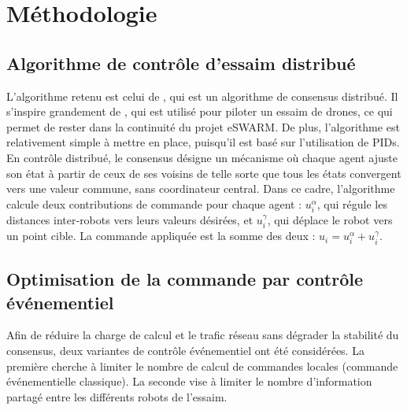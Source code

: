 \section{Méthodologie}

\subsection{Algorithme de contrôle d'essaim distribué}

L'algorithme retenu est celui de \cite{koung_consensus-based_2020}, qui est un algorithme de consensus distribué. Il s'inspire grandement de \cite{saif_distributed_2019}, qui est utilisé pour piloter un essaim de drones, ce qui permet de rester dans la continuité du projet eSWARM. De plus, l'algorithme est relativement simple à mettre en place, puisqu'il est basé sur l'utilisation de PIDs. 
En contrôle distribué, le consensus désigne un mécanisme où chaque agent ajuste son état à partir de ceux de ses voisins de telle sorte que tous les états convergent vers une valeur commune, sans coordinateur central.
Dans ce cadre, l’algorithme calcule deux contributions de commande pour chaque agent : $u_i^\alpha$, qui régule les distances inter‑robots vers leurs valeurs désirées, et $u_i^\gamma$, qui déplace le robot vers un point cible. La commande appliquée est la somme des deux : $u_i = u_i^\alpha + u_i^\gamma$.


\subsection{Optimisation de la commande par contrôle événementiel}
Afin de réduire la charge de calcul et le trafic réseau sans dégrader la stabilité du consensus, deux variantes de contrôle événementiel ont été considérées. La première cherche à limiter le nombre de calcul de commandes locales (commande événementielle classique). La seconde vise à limiter le nombre d'information partagé entre les différents robots de l'essaim.

